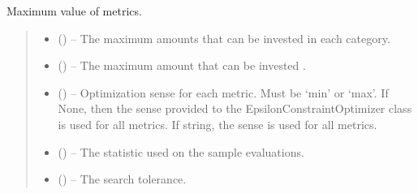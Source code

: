 \documentclass[letterpaper,10pt,english]{sphinxmanual}
\begin{document}
\begin{fulllineitems}
\begin{fulllineitems}
\end{fulllineitems}


\begin{fulllineitems}
\label{\detokenize{tyche:tyche.EpsilonConstraints.EpsilonConstraintOptimizer.optimum_metrics}}
\pysigstartsignatures
{}
\pysigstopsignatures
\sphinxAtStartPar
Maximum value of metrics.
\begin{quote}\begin{description}
\begin{itemize}
\item {} 
\sphinxAtStartPar
{} () – The maximum amounts that can be invested in each category.

\item {} 
\sphinxAtStartPar
{} () – The maximum amount that can be invested .

\item {} 
\sphinxAtStartPar
{} () – Optimization sense for each metric. Must be ‘min’ or ‘max’. If None, then
the sense provided to the EpsilonConstraintOptimizer class is used for
all metrics. If string, the sense is used for all metrics.

\item {} 
\sphinxAtStartPar
{} () – The statistic used on the sample evaluations.

\item {} 
\sphinxAtStartPar
{} () – The search tolerance.


\end{itemize}
\end{description}
\end{quote}
\end{fulllineitems}
\end{fulllineitems}
\end{document}
